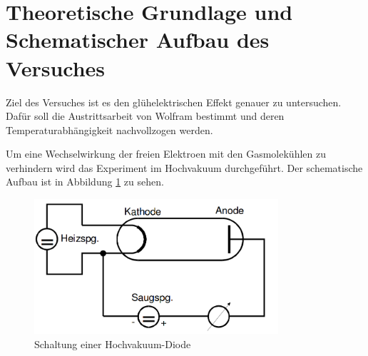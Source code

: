 \section{Theoretische Grundlage und Schematischer Aufbau des Versuches}
\label{sec:Theorie}
Ziel des Versuches ist es den glühelektrischen Effekt genauer zu untersuchen. Dafür soll die Austrittsarbeit von Wolfram bestimmt und deren Temperaturabhängigkeit nachvollzogen werden. 

Um eine Wechselwirkung der freien Elektroen mit den Gasmolekühlen zu verhindern wird das Experiment im Hochvakuum durchgeführt. Der schematische Aufbau ist in Abbildung \ref{fig:SHD} zu sehen. 

\begin{figure}
  \centering
  \includegraphics[height=5cm]{picture/Diode.png}
  \caption{Schaltung einer Hochvakuum-Diode \cite{pra}}
  \label{fig:SHD}
\end{figure}

